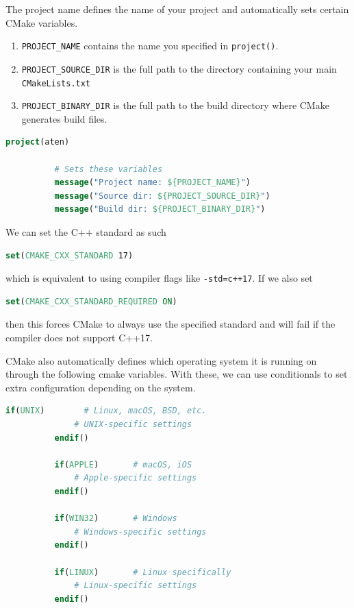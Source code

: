 \documentclass{article}
\newcounter{definition}[section]
\begin{document}
      \begin{definition}
        \label{def:project-name}
        The project name defines the name of your project and automatically sets certain CMake variables. 
        \begin{enumerate}
          \item \texttt{PROJECT\_NAME} contains the name you specified in \texttt{project()}. 
          \item \texttt{PROJECT\_SOURCE\_DIR} is the full path to the directory containing your main \texttt{CMakeLists.txt} 
          \item \texttt{PROJECT\_BINARY\_DIR} is the full path to the build directory where CMake generates build files. 
        \end{enumerate}
        \begin{lstlisting}[language=CMake]
          project(aten)

          # Sets these variables
          message("Project name: ${PROJECT_NAME}")
          message("Source dir: ${PROJECT_SOURCE_DIR}")
          message("Build dir: ${PROJECT_BINARY_DIR}") 
        \end{lstlisting}
      \end{definition}

      \begin{definition}[C++ Standards]
        \label{def:c-standards}
        We can set the C++ standard as such
        \begin{lstlisting}[language=CMake]
          set(CMAKE_CXX_STANDARD 17)
        \end{lstlisting}
        which is equivalent to using compiler flags like \texttt{-std=c++17}. If we also set 
        \begin{lstlisting}[language=CMake]
          set(CMAKE_CXX_STANDARD_REQUIRED ON)
        \end{lstlisting}
        then this forces CMake to always use the specified standard and will fail if the compiler does not support C++17. 
      \end{definition}

      \begin{definition}
        \label{def:operating-systems}
        CMake also automatically defines which operating system it is running on through the following cmake variables. With these, we can use conditionals to set extra configuration depending on the system. 
        \begin{lstlisting}[language=CMake]
          if(UNIX)        # Linux, macOS, BSD, etc.
              # UNIX-specific settings
          endif()

          if(APPLE)       # macOS, iOS
              # Apple-specific settings
          endif()

          if(WIN32)       # Windows
              # Windows-specific settings
          endif()

          if(LINUX)       # Linux specifically
              # Linux-specific settings
          endif() 
        \end{lstlisting}
      \end{definition}
\end{document}
